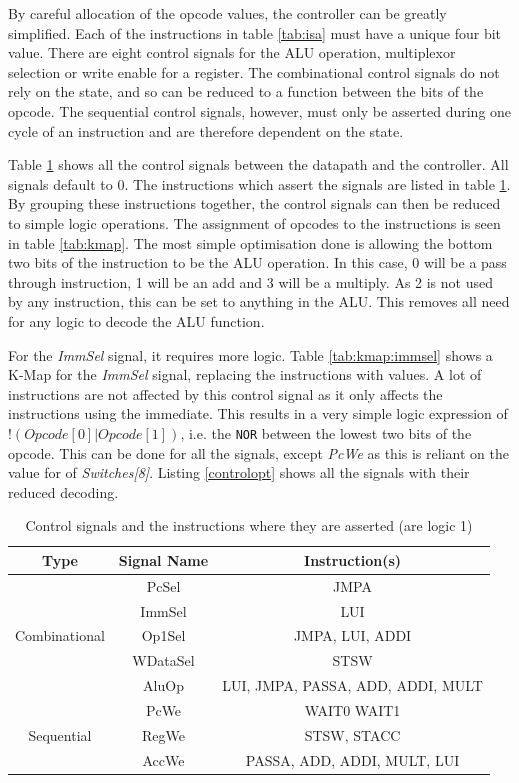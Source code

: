 By careful allocation of the opcode values, the controller can be greatly simplified. 
Each of the instructions in table \ref{tab:isa} must have a unique four bit value. 
There are eight control signals for the ALU operation, multiplexor selection or write enable for a register. 
The combinational control signals do not rely on the state, and so can be reduced to a function between the bits of the opcode. 
The sequential control signals, however, must only be asserted during one cycle of an instruction and are therefore dependent on the state. 

Table \ref{tab:controlsignals} shows all the control signals between the datapath and the controller. 
All signals default to 0.
The instructions which assert the signals are listed in table \ref{tab:controlsignals}. 
By grouping these instructions together, the control signals can then be reduced to simple logic operations.
The assignment of opcodes to the instructions is seen in table \ref{tab:kmap}. 
The most simple optimisation done is allowing the bottom two bits of the instruction to be the ALU operation. 
In this case, 0 will be a pass through instruction, 1 will be an add and 3 will be a multiply. 
As 2 is not used by any instruction, this can be set to anything in the ALU.
This removes all need for any logic to decode the ALU function. 

For the \textit{ImmSel} signal, it requires more logic. 
Table \ref{tab:kmap:immsel} shows a K-Map for the \textit{ImmSel} signal, replacing the instructions with values.
A lot of instructions are not affected by this control signal as it only affects the instructions using the immediate. 
This results in a very simple logic expression of $!(Opcode[0] | Opcode[1])$, i.e. the \texttt{NOR} between the lowest two bits of the opcode. 
This can be done for all the signals, except \textit{PcWe} as this is reliant on the value for of \textit{Switches[8]}. 
Listing \ref{controlopt} shows all the signals with their reduced decoding. 

\begin{table}
\caption{Control signals and the instructions where they are asserted (are logic 1)}
\label{tab:controlsignals}
\centering
\begin{tabular}{ccc} \toprule
Type & Signal Name & Instruction(s) \\ \midrule
\multirow{5}{*}{Combinational} & PcSel & JMPA \\ 
 & ImmSel & LUI \\
 & Op1Sel & JMPA, LUI, ADDI \\
 & WDataSel & STSW \\ 
 & AluOp & LUI, JMPA, PASSA, ADD, ADDI, MULT \\ \midrule
\multirow{3}{*}{Sequential} & PcWe & WAIT0 WAIT1 \\
 & RegWe & STSW, STACC \\
 & AccWe &  PASSA, ADD, ADDI, MULT, LUI \\ \bottomrule

\end{tabular}
\end{table}

